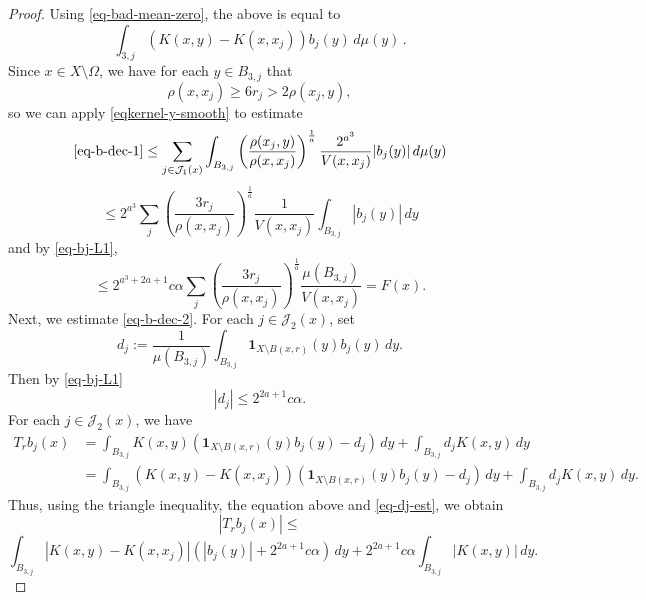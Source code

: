 \documentclass[10pt,a4paper]{article}
\theoremstyle{plain}
\theoremstyle{definition}
\numberwithin{equation}{subsection}
\begin{document}
\begin{proof}
Using \eqref{eq-bad-mean-zero}, the above is equal to
\begin{equation*}
    \int_{{3,j}} (K(x,y)-K(x,x_j)) b_j(y)\,d\mu(y)\,.
\end{equation*}
Since $x\in X\setminus\Omega$, we have for each $y\in B_{3,j}$ that
\begin{equation}
    \label{eq-Om-cj}
    \rho(x,x_j)\ge 6r_j > 2\rho(x_j,y),
\end{equation}
so we can apply \eqref{eqkernel-y-smooth} to estimate
\begin{equation*}
    \eqref{eq-b-dec-1} \le \sum_{j\in \mathcal{J}_1(x)}\int_{B_{3,j}}\left(\frac{\rho(x_j,y)}{\rho(x,x_j)}\right)^{\frac{1}{a}}\frac{2^{a^3}}{V(x,x_j)} |b_j(y)|\, d\mu(y)
\end{equation*}
\begin{equation}
    \le 2^{a^3} \sum_{j} \left(\frac{3r_j}{\rho(x,x_j)}\right)^{\frac{1}{a}}\frac{1}{V(x,x_j)}\int_{B_{3,j}} |b_j(y)|\, dy
\end{equation}
and by \eqref{eq-bj-L1},
\begin{equation}
    \label{eq-J1-diff-est}
    \le 2^{a^3+2a+1} c\alpha \sum_{j} \left(\frac{3r_j}{\rho(x,x_j)}\right)^{\frac{1}{a}}\frac{\mu(B_{3,j})}{V(x,x_j)} = F(x).
\end{equation}
Next, we estimate \eqref{eq-b-dec-2}. For each $j\in \mathcal{J}_2(x)$, set
\begin{equation*}
    d_j:=\frac{1}{\mu(B_{3,j})}\int_{B_{3,j}} \mathbf{1}_{X\setminus B(x,r)}(y) b_j(y)\, dy.
\end{equation*}
Then by \eqref{eq-bj-L1}
\begin{equation}
    \label{eq-dj-est}
    |d_j|\le 2^{2a+1} c\alpha.
\end{equation}
For each $j\in \mathcal{J}_2(x)$, we have
\begin{align*}
    T_r b_j(x)&=\int_{B_{3,j}} K(x,y) (\mathbf{1}_{X\setminus B(x,r)}(y)b_j(y)-d_j)\, dy + \int_{B_{3,j}} d_j K(x,y) \, dy \\
    &= \int_{B_{3,j}} (K(x,y)-K(x,x_j)) (\mathbf{1}_{X\setminus B(x,r)}(y)b_j(y)-d_j)\, dy + \int_{B_{3,j}} d_j K(x,y) \, dy.
\end{align*}
Thus, using the triangle inequality, the equation above and \eqref{eq-dj-est}, we obtain
\begin{equation*}
    |T_r b_j(x)|\le
\end{equation*}
\begin{equation}
    \label{eq-J2-diff-est}
    \int_{B_{3,j}} |K(x,y)-K(x,x_j)| \left(|b_j(y)|+2^{2a+1} c\alpha\right)\, dy +2^{2a+1} c\alpha \int_{B_{3,j}}  |K(x,y)| \, dy.

\end{equation}
\end{proof}
\end{document}
